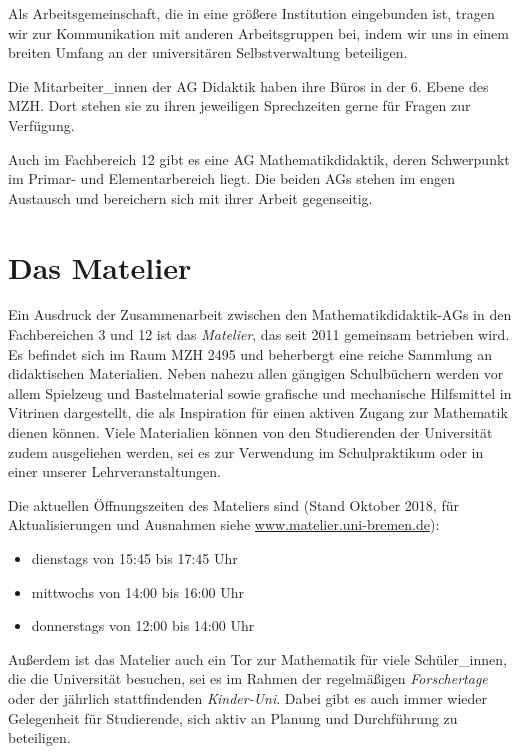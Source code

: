 \documentclass[ngerman,bibliography=totoc,oneside,12pt,a4paper]{scrbook}
\begin{document}
Als Arbeitsgemeinschaft, die in eine größere Institution eingebunden
ist, tragen wir zur Kommunikation mit anderen Arbeitsgruppen bei, indem
wir uns in einem breiten Umfang an der universitären Selbstverwaltung
beteiligen.

Die Mitarbeiter\_innen der AG Didaktik haben ihre Büros in der 6. Ebene
des MZH. Dort stehen sie zu ihren jeweiligen Sprechzeiten gerne für
Fragen zur Verfügung.

Auch im Fachbereich 12 gibt es eine AG Mathematikdidaktik, deren
Schwerpunkt im Primar- und Elementarbereich liegt. Die beiden AGs stehen
im engen Austausch und bereichern sich mit ihrer Arbeit gegenseitig.

\section{Das Matelier}\label{das-matelier}

Ein Ausdruck der Zusammenarbeit zwischen den Mathematikdidaktik-AGs in
den Fachbereichen 3 und 12 ist das \emph{Matelier}, das seit 2011
gemeinsam betrieben wird. Es befindet sich im Raum MZH 2495 und
beherbergt eine reiche Sammlung an didaktischen Materialien. Neben
nahezu allen gängigen Schulbüchern werden vor allem Spielzeug und
Bastelmaterial sowie grafische und mechanische Hilfsmittel in Vitrinen
dargestellt, die als Inspiration für einen aktiven Zugang zur Mathematik
dienen können. Viele Materialien können von den Studierenden der
Universität zudem ausgeliehen werden, sei es zur Verwendung im
Schulpraktikum oder in einer unserer Lehrveranstaltungen.

Die aktuellen Öffnungszeiten des Mateliers sind (Stand Oktober 2018, für
Aktualisierungen und Ausnahmen siehe
\href{https://www.matelier.uni-bremen.de}{www.matelier.uni-bremen.de}):

\begin{itemize}
\item
  dienstags von 15:45 bis 17:45 Uhr
\item
  mittwochs von 14:00 bis 16:00 Uhr
\item
  donnerstags von 12:00 bis 14:00 Uhr
\end{itemize}

Außerdem ist das Matelier auch ein Tor zur Mathematik für viele
Schüler\_innen, die die Universität besuchen, sei es im Rahmen der
regelmäßigen \emph{Forschertage} oder der jährlich stattfindenden
\emph{Kinder-Uni}. Dabei gibt es auch immer wieder Gelegenheit für
Studierende, sich aktiv an Planung und Durchführung zu beteiligen.
\end{document}
